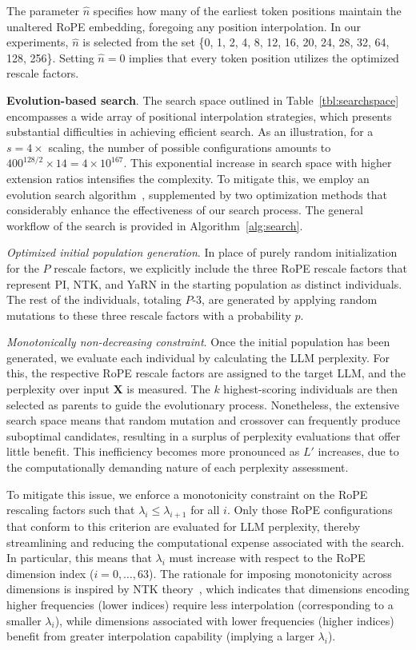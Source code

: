 The parameter $\hat{n}$ specifies how many of the earliest token positions maintain the unaltered RoPE embedding, foregoing any position interpolation. In our experiments, $\hat{n}$ is selected from the set \{0, 1, 2, 4, 8, 12, 16, 20, 24, 28, 32, 64, 128, 256\}. Setting $\hat{n}=0$ implies that every token position utilizes the optimized rescale factors.

\textbf{Evolution-based search}. The search space outlined in Table~\ref{tbl:searchspace} encompasses a wide array of positional interpolation strategies, which presents substantial difficulties in achieving efficient search. As an illustration, for a $s=4\times$ scaling, the number of possible configurations amounts to $400^{128/2}\times14=4\times10^{167}$. This exponential increase in search space with higher extension ratios intensifies the complexity. To mitigate this, we employ an evolution search algorithm~\cite{guo2020single}, supplemented by two optimization methods that considerably enhance the effectiveness of our search process. The general workflow of the search is provided in Algorithm~\ref{alg:search}.

\textit{Optimized initial population generation}. In place of purely random initialization for the $P$ rescale factors, we explicitly include the three RoPE rescale factors that represent PI, NTK, and YaRN in the starting population as distinct individuals. The rest of the individuals, totaling $P$-3, are generated by applying random mutations to these three rescale factors with a probability $p$.

\textit{Monotonically non-decreasing constraint}. Once the initial population has been generated, we evaluate each individual by calculating the LLM perplexity. For this, the respective RoPE rescale factors are assigned to the target LLM, and the perplexity over input $\mathbf{X}$ is measured. The $k$ highest-scoring individuals are then selected as parents to guide the evolutionary process. Nonetheless, the extensive search space means that random mutation and crossover can frequently produce suboptimal candidates, resulting in a surplus of perplexity evaluations that offer little benefit. This inefficiency becomes more pronounced as $L'$ increases, due to the computationally demanding nature of each perplexity assessment.

To mitigate this issue, we enforce a monotonicity constraint on the RoPE rescaling factors such that $\lambda_i\leq \lambda_{i+1}$ for all $i$. Only those RoPE configurations that conform to this criterion are evaluated for LLM perplexity, thereby streamlining and reducing the computational expense associated with the search. In particular, this means that $\lambda_i$ must increase with respect to the RoPE dimension index ($i=0, \ldots, 63$). The rationale for imposing monotonicity across dimensions is inspired by NTK theory~\cite{jacot2018neural,tancik2020fourier,ntk}, which indicates that dimensions encoding higher frequencies (lower indices) require less interpolation (corresponding to a smaller $\lambda_i$), while dimensions associated with lower frequencies (higher indices) benefit from greater interpolation capability (implying a larger $\lambda_i$).

